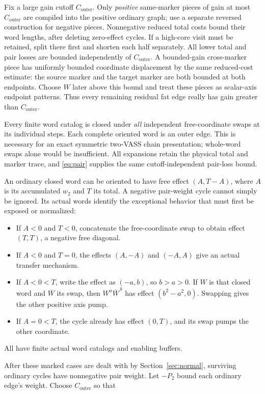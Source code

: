 \documentclass[11pt,a4paper]{article}
\theoremstyle{remark}
\newcommand{\Co}{C_{\mathrm{outer}}}
\begin{document}
Fix a large gain cutoff \(\Co\). Only \emph{positive} same-marker pieces of gain at most \(\Co\) are compiled into the positive ordinary graph; use a separate reversed construction for negative pieces. Nonnegative reduced total costs bound their word lengths, after deleting zero-effect cycles. If a high-core visit must be retained, split there first and shorten each half separately. All lower total and pair losses are bounded independently of \(\Co\). A bounded-gain cross-marker piece has uniformly bounded coordinate displacement by the same reduced-cost estimate: the source marker and the target marker are both bounded at both endpoints. Choose \(W\) later above this bound and treat these pieces as scalar-axis endpoint patterns. Thus every remaining residual fat edge really has gain greater than \(\Co\).

Every finite word catalog is closed under \emph{all} independent free-coordinate swaps at its individual steps. Each complete oriented word is an outer edge. This is necessary for an exact symmetric two-VASS chain presentation; whole-word swaps alone would be insufficient. All expansions retain the physical total and marker trace, and \eqref{eq:pair} supplies the same cutoff-independent pair-loss bound.

An ordinary closed word can be oriented to have free effect \((A,T-A)\), where \(A\) is its accumulated \(w_2\) and \(T\) its total. A negative pair-weight cycle cannot simply be ignored. Its
actual words identify the exceptional behavior that must first be
exposed or normalized:
\begin{itemize}[leftmargin=*]
\item If \(A<0\) and \(T<0\), concatenate the free-coordinate swap
to obtain effect \((T,T)\), a negative free diagonal.
\item If \(A<0\) and \(T=0\), the effects \((A,-A)\) and
\((-A,A)\) give an actual transfer mechanism.
\item If \(A<0<T\), write the effect as \((-a,b)\), so \(b>a>0\).
If \(W\) is that closed word and \(\overline W\) its swap, then
\(W^a\overline W^{\,b}\) has effect \((b^2-a^2,0)\).
Swapping gives the other positive axis pump.
\item If \(A=0<T\), the cycle already has effect \((0,T)\),
and its swap pumps the other coordinate.
\end{itemize} All have finite actual word catalogs and enabling buffers.

After these marked cases are dealt with by Section~\ref{sec:normal}, surviving ordinary cycles have nonnegative pair weight. Let \(-P_2\) bound each ordinary edge's weight. Choose \(\Co\) so that
\end{document}
